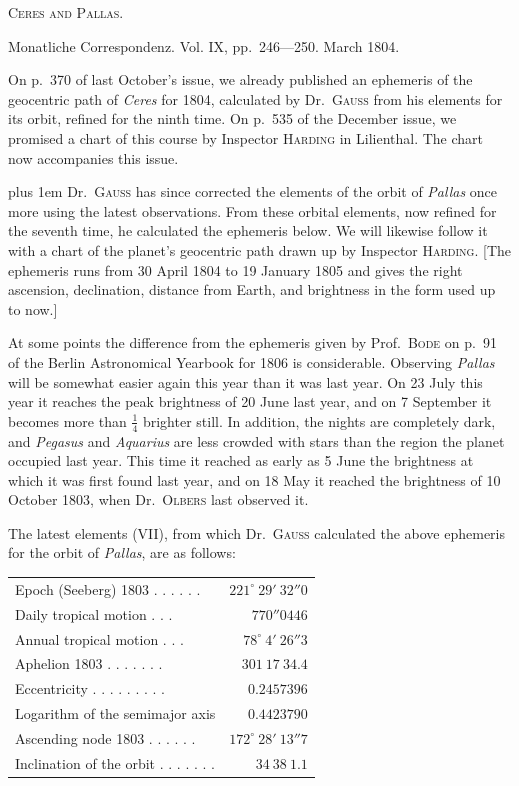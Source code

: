 \centerline{\textsc{Ceres and Pallas.}}

\medskip
Monatliche Correspondenz. Vol. IX, pp.\ 246—250. March 1804.

\medskip
On p.\ 370 of last October’s issue, we already published an ephemeris of the geocentric path of \emph{Ceres} for 1804, calculated by Dr.\ \textsc{Gauss} from his elements for its orbit, refined for the ninth time. On p.\ 535 of the December issue, we promised a chart of this course by Inspector \textsc{Harding} in Lilienthal. The chart now accompanies this issue.

{\rightskip=0pt plus 1em
Dr.\ \textsc{Gauss} has since corrected the elements of the orbit of \emph{Pallas} once more using the latest observations. From these orbital elements, now refined for the seventh time, he calculated the ephemeris below. We will likewise follow it with a chart of the planet’s geocentric path drawn up by Inspector \textsc{Harding}. [The ephemeris runs from 30 April 1804 to 19 January 1805 and gives the right ascension, declination, distance from Earth, and brightness in the form used up to now.]\par}


At some points the difference from the ephemeris given by Prof.\ \textsc{Bode} on p.\ 91 of the Berlin Astronomical Yearbook for 1806 is considerable. Observing \emph{Pallas} will be somewhat easier again this year than it was last year. On 23 July this year it reaches the peak brightness of 20 June last year, and on 7 September it becomes more than $\frac{1}{4}$ brighter still. In addition, the nights are completely dark, and \emph{Pegasus} and \emph{Aquarius} are less crowded with stars than the region the planet occupied last year. This time it reached as early as 5 June the brightness at which it was first found last year, and on 18 May it reached the brightness of 10 October 1803, when Dr.\ \textsc{Olbers} last observed it.

The latest elements (VII), from which Dr.\ \textsc{Gauss} calculated the above ephemeris for the orbit of \emph{Pallas}, are as follows:

\begin{center}
\begingroup\fontsize{9}{11}\selectfont\setlength{\tabcolsep}{3pt}
\begin{tabular}{lr}
Epoch (Seeberg) 1803 . . . . . . & $221^\circ\ 29'\ 32''0$ \\
Daily tropical motion . . . & $770''0446$ \\
Annual tropical motion . . . & $78^\circ\ 4'\ 26''3$ \\
Aphelion 1803 . . . . . . . & $301\ 17\ 34.4$ \\
Eccentricity . . . . . . . . . & $0.2457396$ \\
Logarithm of the semimajor axis  & $0.4423790$ \\
Ascending node 1803 . . . . . . & $172^\circ\ 28'\ 13''7$ \\
Inclination of the orbit . . . . . . . & $34\ 38\ 1.1$ \\
\end{tabular}\endgroup
\end{center}
%

